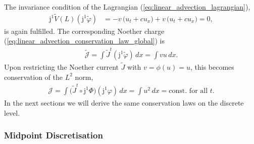 \documentclass[12pt,a4paper,reqno]{article}
\begin{document}
The invariance condition of the Lagrangian (\ref{eq:linear_advection_lagrangian}),
\begin{align}
{\ensuremath{\mathrm{j}}}^{1} \tilde{V} (L) ({\ensuremath{\mathrm{j}}}^{1} \tilde{\ensuremath{\varphi}})
&= - {\ensuremath{{\ensuremath{{v}}}}} \, \big( {\ensuremath{{\ensuremath{{u}}}}}_{\ensuremath{{\ensuremath{{t}}}}} + c {\ensuremath{{\ensuremath{{u}}}}}_{\ensuremath{{\ensuremath{{x}}}}} \big) + {\ensuremath{{\ensuremath{{v}}}}} \, \big( {\ensuremath{{\ensuremath{{u}}}}}_{\ensuremath{{\ensuremath{{t}}}}} + c {\ensuremath{{\ensuremath{{u}}}}}_{\ensuremath{{\ensuremath{{x}}}}} \big) = 0 ,
\end{align}
is again fulfilled.
The corresponding Noether charge (\ref{eq:linear_advection_conservation_law_global}) is
\begin{align}
\tilde{\mathcal{J}}
= \int \tilde{J}^{t} ({\ensuremath{\mathrm{j}}}^{1} \tilde{\ensuremath{\varphi}}) \, d{\ensuremath{{\ensuremath{{x}}}}}
= \int {\ensuremath{{\ensuremath{{v}}}}} {\ensuremath{{\ensuremath{{u}}}}} \, d{\ensuremath{{\ensuremath{{x}}}}} .
\end{align}
Upon restricting the Noether current $\tilde{J}$ with ${\ensuremath{{\ensuremath{{v}}}}} = \phi ({\ensuremath{{\ensuremath{{u}}}}}) = {\ensuremath{{\ensuremath{{u}}}}}$, this becomes conservation of the $L^{2}$ norm,
\begin{align}
\mathcal{J}
= \int \big( \tilde{J}^{t} \circ {\ensuremath{\mathrm{j}}}^{1} \Phi \big) ({\ensuremath{\mathrm{j}}}^{1} {\ensuremath{\varphi}}) \, d{\ensuremath{{\ensuremath{{x}}}}}
= \int {\ensuremath{{\ensuremath{{u}}}}}^{2} \, d{\ensuremath{{\ensuremath{{x}}}}}
= \text{const. for all ${\ensuremath{{\ensuremath{{t}}}}}$} .
\end{align}
In the next sections we will derive the same conservation laws on the discrete level.

\subsubsection{Midpoint Discretisation}
\label{sec:linear_advection_midpoint}
\end{document}
